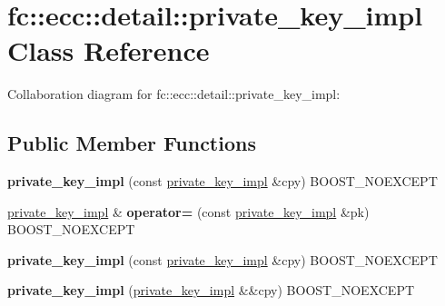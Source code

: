 \hypertarget{classfc_1_1ecc_1_1detail_1_1private__key__impl}{}\section{fc\+:\+:ecc\+:\+:detail\+:\+:private\+\_\+key\+\_\+impl Class Reference}
\label{classfc_1_1ecc_1_1detail_1_1private__key__impl}


Collaboration diagram for fc\+:\+:ecc\+:\+:detail\+:\+:private\+\_\+key\+\_\+impl\+:
\subsection*{Public Member Functions}
\begin{DoxyCompactItemize}
\item 
\mbox{\label{classfc_1_1ecc_1_1detail_1_1private__key__impl_aeb7ccb07feb9b8820b250c6b9c40028f}} 
{\bfseries private\+\_\+key\+\_\+impl} (const \mbox{\hyperlink{classfc_1_1ecc_1_1detail_1_1private__key__impl}{private\+\_\+key\+\_\+impl}} \&cpy) B\+O\+O\+S\+T\+\_\+\+N\+O\+E\+X\+C\+E\+PT
\item 
\mbox{\label{classfc_1_1ecc_1_1detail_1_1private__key__impl_a9a114d32d88f0621d7d280d7b627542d}} 
\mbox{\hyperlink{classfc_1_1ecc_1_1detail_1_1private__key__impl}{private\+\_\+key\+\_\+impl}} \& {\bfseries operator=} (const \mbox{\hyperlink{classfc_1_1ecc_1_1detail_1_1private__key__impl}{private\+\_\+key\+\_\+impl}} \&pk) B\+O\+O\+S\+T\+\_\+\+N\+O\+E\+X\+C\+E\+PT
\item 
\mbox{\label{classfc_1_1ecc_1_1detail_1_1private__key__impl_aeb7ccb07feb9b8820b250c6b9c40028f}} 
{\bfseries private\+\_\+key\+\_\+impl} (const \mbox{\hyperlink{classfc_1_1ecc_1_1detail_1_1private__key__impl}{private\+\_\+key\+\_\+impl}} \&cpy) B\+O\+O\+S\+T\+\_\+\+N\+O\+E\+X\+C\+E\+PT
\item 
\mbox{\label{classfc_1_1ecc_1_1detail_1_1private__key__impl_aa36075ad0cfd5bf538f2c4171d8b7aeb}} 
{\bfseries private\+\_\+key\+\_\+impl} (\mbox{\hyperlink{classfc_1_1ecc_1_1detail_1_1private__key__impl}{private\+\_\+key\+\_\+impl}} \&\&cpy) B\+O\+O\+S\+T\+\_\+\+N\+O\+E\+X\+C\+E\+PT

\end{DoxyCompactItemize}
